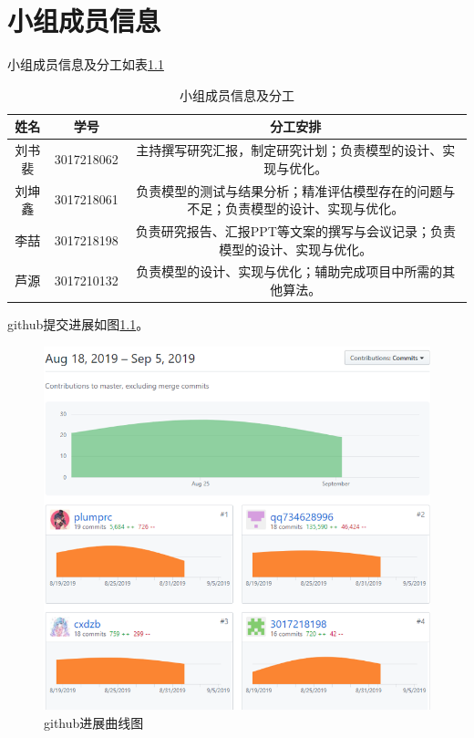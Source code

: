 
\chapter{小组成员信息}

小组成员信息及分工如表\ref{table::stuinfo1}

\begin{table}[htbp]
\centering
\caption{小组成员信息及分工}
\label{table::stuinfo1}
\begin{tabular}{|c|c|c|}
\hline
姓名& 学号& 分工安排\\
\hline
刘书裴& 3017218062& \multicolumn{1}{|m{7cm}|}{主持撰写研究汇报，制定研究计划；负责模型的设计、实现与优化。}\\
\hline
刘坤鑫& 3017218061& \multicolumn{1}{|m{7cm}|}{负责模型的测试与结果分析；精准评估模型存在的问题与不足；负责模型的设计、实现与优化。}\\
\hline
李喆  & 3017218198& \multicolumn{1}{|m{7cm}|}{负责研究报告、汇报PPT等文案的撰写与会议记录；负责模型的设计、实现与优化。}\\
\hline
芦源  & 3017210132& \multicolumn{1}{|m{7cm}|}{负责模型的设计、实现与优化；辅助完成项目中所需的其他算法。}\\
\hline
\end{tabular}
\end{table}

github提交进展如图\ref{fig::stuinfo1}。

\begin{figure}[htbp]
\centering
\includegraphics[width=0.8\linewidth]{body/stuinfo_pic/1}
\caption{github进展曲线图}
\label{fig::stuinfo1}
\end{figure}
